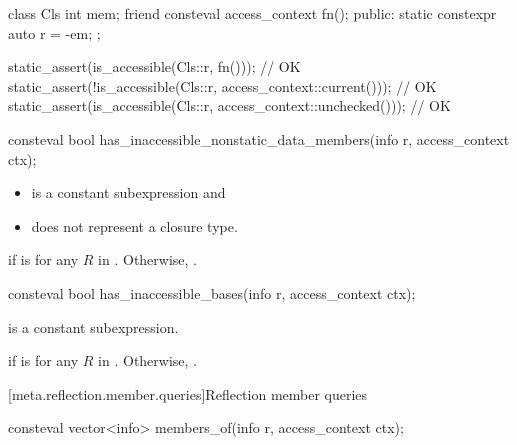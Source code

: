\begin{itemdescr}
\begin{example}
\begin{codeblock}
class Cls {
  int mem;
  friend consteval access_context fn();
public:
  static constexpr auto r = ^^mem;
};

static_assert(is_accessible(Cls::r, fn()));                             // OK
static_assert(!is_accessible(Cls::r, access_context::current()));       // OK
static_assert(is_accessible(Cls::r, access_context::unchecked()));      // OK
\end{codeblock}
\end{example}
\end{itemdescr}

%
\begin{itemdecl}
consteval bool has_inaccessible_nonstatic_data_members(info r, access_context ctx);
\end{itemdecl}

\begin{itemdescr}
\pnum
\constantwhen
\begin{itemize}
\item
  is a constant subexpression and
\item
   does not represent a closure type.
\end{itemize}

\pnum
\returns
{} if  is 
for any $R$ in .
Otherwise, .
\end{itemdescr}

\begin{itemdecl}
consteval bool has_inaccessible_bases(info r, access_context ctx);
\end{itemdecl}

\begin{itemdescr}
\pnum
\constantwhen
{}
is a constant subexpression.

\pnum
\returns
{} if  is 
for any $R$ in .
Otherwise, .
\end{itemdescr}

[meta.reflection.member.queries]{Reflection member queries}

%
\begin{itemdecl}
consteval vector<info> members_of(info r, access_context ctx);
\end{itemdecl}

